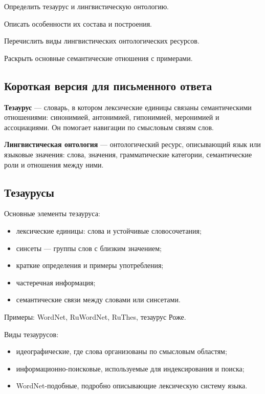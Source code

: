 
\begin{examplan}
    \item Определить тезаурус и лингвистическую онтологию.
    \item Описать особенности их состава и построения.
    \item Перечислить виды лингвистических онтологических ресурсов.
    \item Раскрыть основные семантические отношения с примерами.
\end{examplan}

\subsection*{Короткая версия для письменного ответа}

\textbf{Тезаурус} --- словарь, в котором лексические единицы связаны семантическими отношениями: синонимией, антонимией, гипонимией, меронимией и ассоциациями. Он помогает навигации по смысловым связям слов.

\textbf{Лингвистическая онтология} --- онтологический ресурс, описывающий язык или языковые значения: слова, значения, грамматические категории, семантические роли и отношения между ними.

\subsection*{Тезаурусы}

Основные элементы тезауруса:
\begin{itemize}
    \item лексические единицы: слова и устойчивые словосочетания;
    \item синсеты --- группы слов с близким значением;
    \item краткие определения и примеры употребления;
    \item частеречная информация;
    \item семантические связи между словами или синсетами.
\end{itemize}

Примеры: WordNet, RuWordNet, RuThes, тезаурус Роже.

Виды тезаурусов:
\begin{itemize}
    \item идеографические, где слова организованы по смысловым областям;
    \item информационно-поисковые, используемые для индексирования и поиска;
    \item WordNet-подобные, подробно описывающие лексическую систему языка.
\end{itemize}

